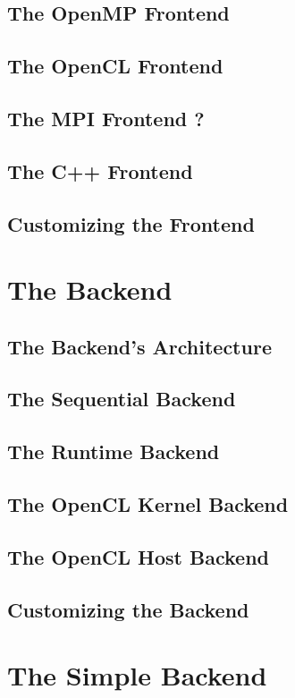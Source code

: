 \subsection{The OpenMP Frontend}
\subsection{The OpenCL Frontend}
\subsection{The MPI Frontend ?}
\subsection{The C++ Frontend}
\subsection{Customizing the Frontend}

\section{The Backend}
\subsection{The Backend's Architecture}
\subsection{The Sequential Backend}
\subsection{The Runtime Backend}
\subsection{The OpenCL Kernel Backend}
\subsection{The OpenCL Host Backend}
\subsection{Customizing the Backend}

\section{The Simple Backend}

